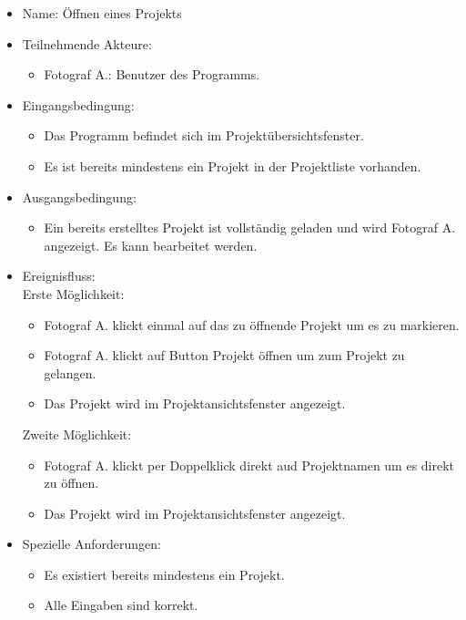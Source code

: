 		\begin{itemize}
			\item Name: Öffnen eines Projekts
			\item Teilnehmende Akteure:
			\begin{itemize}
				\item	Fotograf A.: Benutzer des Programms.		
			\end{itemize}
			\item Eingangsbedingung:
			\begin{itemize}
				\item	Das Programm befindet sich im Projektübersichtsfenster.
				\item Es ist bereits mindestens ein Projekt in der Projektliste vorhanden.
			\end{itemize}
			\item Ausgangsbedingung:
			\begin{itemize}
				\item	Ein bereits erstelltes Projekt ist vollständig geladen und wird Fotograf A. angezeigt. Es kann bearbeitet werden.		
			\end{itemize}
			\item Ereignisfluss:\\Erste Möglichkeit:
			\begin{itemize}
				\item Fotograf A. klickt einmal auf das zu öffnende Projekt um es zu markieren.
				\item Fotograf A. klickt auf Button Projekt öffnen um zum Projekt zu gelangen.
				\item Das Projekt wird im Projektansichtsfenster angezeigt.
			\end{itemize}
			Zweite Möglichkeit:
			\begin{itemize}
				\item Fotograf A. klickt per Doppelklick direkt aud Projektnamen um es direkt zu öffnen.
				\item Das Projekt wird im Projektansichtsfenster angezeigt.					
			\end{itemize}
			\item Spezielle Anforderungen:
			\begin{itemize}
				\item	Es existiert bereits mindestens ein Projekt.
				\item Alle Eingaben sind korrekt.
			\end{itemize}			
		\end{itemize}
		
